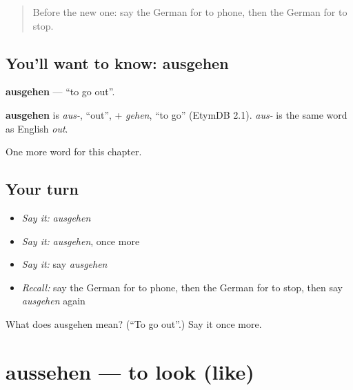 \label{lesson:GE-C144-ausgehen}



\begin{quote}
Before the new one: say the German for to phone, then the German for to stop.
\end{quote}

\subsection*{You'll want to know: ausgehen}
\textbf{ausgehen} — \textquotedblleft{}to go out\textquotedblright{}.

\begin{cousinweb}
\textbf{ausgehen} is \emph{aus-}, \textquotedblleft{}out\textquotedblright{}, + \emph{gehen}, \textquotedblleft{}to go\textquotedblright{} (EtymDB 2.1). \emph{aus-} is the same word as English \emph{out}.
\end{cousinweb}

\begin{grammarlens}[title={What you've built}]
One more word for this chapter.
\end{grammarlens}

\subsection*{Your turn}
\begin{itemize}
\raggedright
  \item \emph{Say it:} \emph{ausgehen}
  \item \emph{Say it:} \emph{ausgehen}, once more
  \item \emph{Say it:} say \emph{ausgehen}
  \item \emph{Recall:} say the German for to phone, then the German for to stop, then say \emph{ausgehen} again
\end{itemize}

\begin{tcolorbox}[breakable,colback=teal!4,colframe=teal!35!black,title={Before you move on}]
What does ausgehen mean? (\textquotedblleft{}To go out\textquotedblright{}.) Say it once more.
\end{tcolorbox}
\section[aussehen]{aussehen — to look (like)}

\label{lesson:GE-C144-aussehen}



